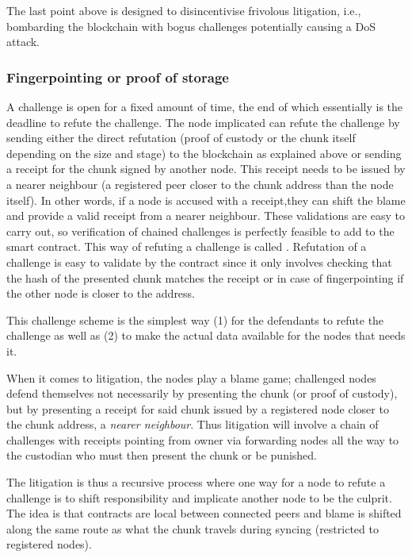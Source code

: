 The last point above is designed to disincentivise frivolous litigation, i.e., bombarding the blockchain with bogus challenges potentially causing a DoS attack.

\subsubsection{Fingerpointing or proof of storage}

A challenge is open for a fixed amount of time, the end of which essentially is the deadline to refute the challenge. 
The node implicated can refute the challenge by sending either the direct refutation (proof of custody or the chunk itself depending on the size and stage) to the blockchain as explained above or sending a receipt for the chunk signed by another node. This receipt needs to be issued by a nearer neighbour (a registered peer closer to the chunk address than the node itself). In other words, if a node is accused with a receipt,they can  shift the blame and provide a valid receipt from a nearer neighbour. These validations are easy to carry out, so verification of chained challenges is perfectly feasible to add to the smart contract. This way of refuting a challenge is called . Refutation of a challenge is easy to validate by the contract since it only involves checking that the hash of the presented chunk matches the receipt or in case of fingerpointing if the other node is closer to the address.

This challenge scheme is the simplest way (1) for the defendants to refute the challenge as well as (2) to make the actual data available for the nodes that needs it.

When it comes to litigation, the nodes play a blame game; challenged nodes defend themselves not necessarily by presenting the chunk (or proof of custody), but by presenting a receipt for said chunk issued by a registered node closer to the chunk address, a \emph{nearer neighbour}. Thus litigation will involve a chain of challenges with receipts pointing from owner via forwarding nodes all the way to the custodian who must then present the chunk or be punished.

The litigation is thus a recursive process where one way for a node to refute a challenge is to shift responsibility and implicate another node to be the culprit.
The idea is that contracts are local between connected peers and blame is shifted along the same route as what the chunk travels during syncing (restricted to registered nodes).


